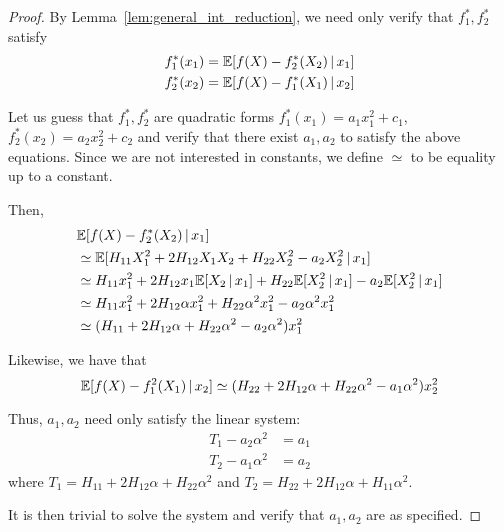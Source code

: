 \begin{proof}
By Lemma~\ref{lem:general_int_reduction}, we need only verify that $f^*_1, f^*_2$ satisfy
\begin{align*}
f^*_1(x_1) &= {\mathbb E}[ f(X) - f_2^*(X_2) {\,|\,} x_1] \\
f^*_2(x_2) &= {\mathbb E}[ f(X) - f_1^*(X_1) {\,|\,} x_2 ] 
\end{align*}


Let us guess that $f^*_1, f^*_2$ are quadratic forms $f^*_1(x_1) = a_1 x_1^2 + c_1$, $f^*_2(x_2) = a_2 x_2^2 + c_2$ and verify that there exist $a_1, a_2$ to satisfy the above equations. Since we are not interested in constants, we define $\simeq$ to be equality up to a constant. 

Then, 
\begin{align*}
&{\mathbb E}[ f(X) - f_2^*(X_2) {\,|\,} x_1]\\
& \simeq {\mathbb E}[ H_{11} X_1^2 + 2H_{12}X_1 X_2 + H_{22}X_2^2 - a_2 X_2^2 {\,|\,} x_1 ] \\ 
    &\simeq H_{11} x_1^2 + 2 H_{12} x_1 {\mathbb E}[X_2 {\,|\,} x_1] + H_{22} {\mathbb E}[X_2^2 {\,|\,} x_1] - a_2{\mathbb E}[X_2^2 {\,|\,} x_1] \\
   &\simeq H_{11} x_1^2 + 2H_{12} \alpha x_1^2 + H_{22} \alpha^2 x_1^2 - a_2 \alpha^2 x_1^2\\
   &\simeq (H_{11} + 2 H_{12} \alpha + H_{22} \alpha^2 - a_2 \alpha^2) x_1^2
\end{align*}

Likewise, we have that
\[
{\mathbb E}[ f(X) - f_1^2(X_1) {\,|\,} x_2] \simeq (H_{22} + 2H_{12}\alpha + H_{22}\alpha^2 - a_1 \alpha^2) x_2^2
\]

Thus, $a_1, a_2$ need only satisfy the linear system:
\begin{align*}
T_1 - a_2 \alpha^2 &= a_1 \\
T_2 - a_1 \alpha^2 &= a_2 
\end{align*}
where $T_1 = H_{11} + 2H_{12} \alpha + H_{22} \alpha^2$ and $T_2 = H_{22} + 2H_{12} \alpha + H_{11} \alpha^2$.

It is then trivial to solve the system and verify that $a_1, a_2$ are as specified.

\end{proof}





